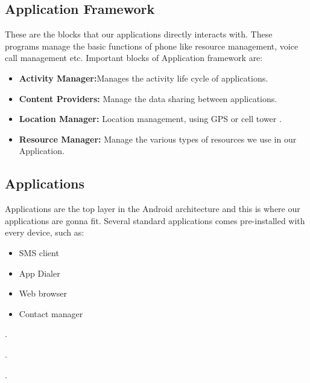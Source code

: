 \subsection{Application Framework}
These are the blocks that our applications directly interacts with. These programs manage the basic functions of phone like resource management, voice call management etc.  Important blocks of Application framework are:
\begin{itemize}
\item \textbf{Activity Manager:}Manages the activity life cycle of applications.
\item \textbf{Content Providers:} Manage the data sharing between applications.
\item \textbf{Location Manager:} Location management, using GPS or cell tower .
\item \textbf{Resource Manager:} Manage the various types of resources we use in our Application.

\end{itemize}


\subsection{Applications}
Applications are the top layer in the Android architecture and this is where our applications are gonna fit. Several standard applications comes pre-installed with every device, such as: 
\begin{itemize}
\item SMS client 
\item App Dialer
\item Web browser
\item Contact manager
\end{itemize}



 .
 


.









 .






